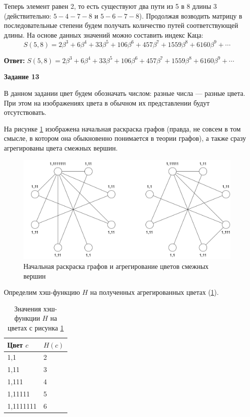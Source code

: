 \documentclass[12pt, a4paper]{extarticle}
\newenvironment*{dummyenv}{}{}
\newcommand{\mysection}[1]{
    \addcontentsline{toc}{section}{#1}
    \begin{dummyenv}
        \bfseries\large #1
    \end{dummyenv}
}
\newcommand{\Answer}[1]{\textbf{Ответ:} #1 \\}
\begin{document}
\begin{enumerate}
        Теперь элемент равен 2, то есть существуют два пути из 5 в 8 длины 3 (действительно: $5-4-7-8$ и
        $5-6-7-8$). Продолжая возводить матрицу в последовательные степени будем получать количество путей
        соответствующей длины. На основе данных значений можно составить индекс Каца:
        \begin{equation*}
            S(5, 8) = 2\beta^3 + 6 \beta^{4} + 33 \beta^{5} + 106 \beta^{6} + 457 \beta^{7} + 
                1559 \beta^{8} + 6160 \beta^{9} + \cdots
        \end{equation*}
        
        \Answer{$S(5, 8) = 2\beta^3 + 6 \beta^{4} + 33 \beta^{5} + 106 \beta^{6} + 457 \beta^{7} + 
            1559 \beta^{8} + 6160 \beta^{9} + \cdots$}
\end{enumerate}

\mysection{Задание 13}

В данном задании цвет будем обозначать числом: разные числа --- разные цвета. При этом на изображениях 
цвета в обычном их представлении будут отсутствовать.

На рисунке \ref{fig:13-1} изображена начальная раскраска графов (правда, не совсем в том смысле, в котором
она обыкновенно понимается в теории графов), а также сразу агрегированы цвета смежных вершин.
 
\begin{figure}[h!]
    \centering
    \includegraphics[width=\textwidth]{task13-1.png}
    \caption{Начальная раскраска графов и агрегирование цветов смежных вершин}
    \label{fig:13-1}
\end{figure}

Определим хэш-функцию $H$ на полученных агрегированных цветах (\ref{tbl:13-1}).
\begin{table}[h!]
    \caption{Значения хэш-функции $H$ на цветах с рисунка \ref{fig:13-1}}
    \label{tbl:13-1}
    \begin{tabularx}{\textwidth}{|X|X|}
        \hline
        Цвет $c$ & $H(c)$ \\
        \hline
        1,1 & 2 \\
        \hline
        1,11 & 3 \\
        \hline
        1,111 & 4 \\
        \hline
        1,11111 & 5 \\
        \hline
        1,1111111  & 6 \\
        \hline
    \end{tabularx}
\end{table}
\end{document}
